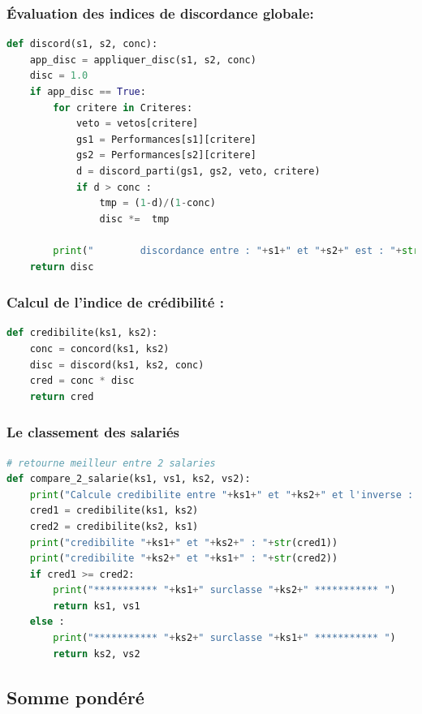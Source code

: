 \subsubsection{Évaluation des indices de discordance globale:}
\begin{lstlisting}[language=Python, frame=single, firstnumber=106]
def discord(s1, s2, conc):
    app_disc = appliquer_disc(s1, s2, conc)
    disc = 1.0
    if app_disc == True:
        for critere in Criteres:
            veto = vetos[critere]
            gs1 = Performances[s1][critere]
            gs2 = Performances[s2][critere]
            d = discord_parti(gs1, gs2, veto, critere)
            if d > conc :
                tmp = (1-d)/(1-conc)
                disc *=  tmp
                   
        print("        discordance entre : "+s1+" et "+s2+" est : "+str(disc) )
    return disc
\end{lstlisting}

\subsubsection{Calcul de l’indice de crédibilité :}
\begin{lstlisting}[language=Python, frame=single, firstnumber=157]
def credibilite(ks1, ks2):
    conc = concord(ks1, ks2)
    disc = discord(ks1, ks2, conc)
    cred = conc * disc
    return cred
\end{lstlisting}


\subsubsection{Le classement des salariés}
\begin{lstlisting}[language=Python, frame=single, firstnumber=157]
# retourne meilleur entre 2 salaries
def compare_2_salarie(ks1, vs1, ks2, vs2):
    print("Calcule credibilite entre "+ks1+" et "+ks2+" et l'inverse : ")
    cred1 = credibilite(ks1, ks2)
    cred2 = credibilite(ks2, ks1)
    print("credibilite "+ks1+" et "+ks2+" : "+str(cred1))
    print("credibilite "+ks2+" et "+ks1+" : "+str(cred2))
    if cred1 >= cred2:
        print("*********** "+ks1+" surclasse "+ks2+" *********** ")
        return ks1, vs1
    else :
        print("*********** "+ks2+" surclasse "+ks1+" *********** ")
        return ks2, vs2
\end{lstlisting}
\newpage
\subsection{Somme pondéré }
